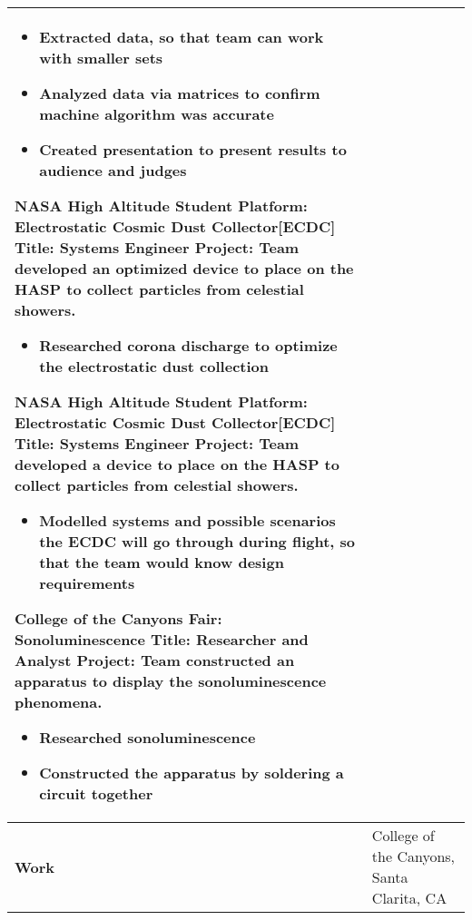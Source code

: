 \documentclass[10pt]{article}
\begin{document}
\begin{tabular}{l l l l}
{        \begin{itemize}[noitemsep,nolistsep]
            \item Extracted data, so that team can work with smaller sets
            \item Analyzed data via matrices to confirm machine algorithm was accurate
            \item Created presentation to present results to audience and judges
        \end{itemize}
        NASA High Altitude Student Platform: Electrostatic Cosmic Dust Collector[ECDC] \newline
        Title: Systems Engineer \newline
        Project: Team developed an optimized device to place on the HASP to collect particles from celestial showers.
        \begin{itemize}[noitemsep,nolistsep]
            \item Researched corona discharge to optimize the electrostatic dust collection
        \end{itemize}
        NASA High Altitude Student Platform: Electrostatic Cosmic Dust Collector[ECDC] \newline
        Title: Systems Engineer \newline
        Project: Team developed a device to place on the HASP to collect particles from celestial showers.
        \begin{itemize}[noitemsep,nolistsep]
            \item Modelled systems and possible scenarios the ECDC will go through during flight, so that the team would know design requirements
        \end{itemize}
        College of the Canyons Fair: Sonoluminescence \newline
        Title: Researcher and Analyst \newline
        Project: Team constructed an apparatus to display the sonoluminescence phenomena.
        \begin{itemize}[noitemsep,nolistsep]
            \item Researched sonoluminescence
            \item Constructed the apparatus by soldering a circuit together
        \end{itemize}} \\ \hline
    \multicolumn{1}{p{1.5cm}}{\textbf{Work}} &
        \multicolumn{3}{p{16cm}}{
        College of the Canyons, Santa Clarita, CA \newline
}
\end{tabular}
\end{document}
